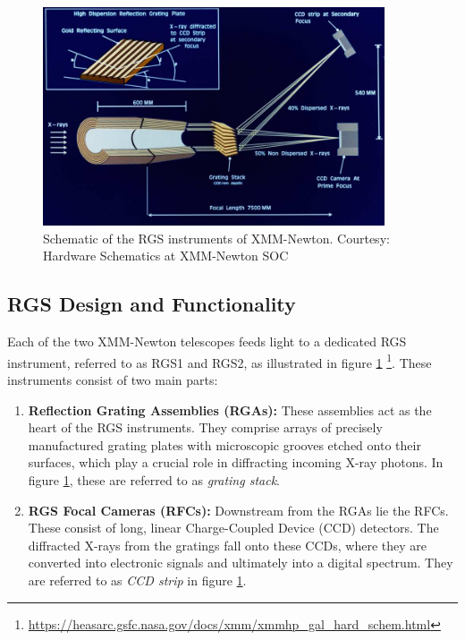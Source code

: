 		\begin{figure}[!htb]
			\centering
			\includegraphics[width=0.9\textwidth]{xmm-rgs.png}
			\caption{Schematic of the RGS instruments of XMM-Newton. Courtesy: Hardware Schematics at XMM-Newton SOC}
			\label{xmm-rgs-instrument}
		\end{figure}
		
		\subsection{RGS Design and Functionality}			
			Each of the two XMM-Newton telescopes feeds light to a dedicated RGS instrument, referred to as RGS1 and RGS2, as illustrated in figure \ref{xmm-rgs-instrument} \footnote{\url{https://heasarc.gsfc.nasa.gov/docs/xmm/xmmhp_gal_hard_schem.html}}. These instruments consist of two main parts:
			\begin{enumerate}
				\item \textbf{Reflection Grating Assemblies (RGAs):} These assemblies act as the heart of the RGS instruments. They comprise arrays of precisely manufactured grating plates with microscopic grooves etched onto their surfaces, which play a crucial role in diffracting incoming X-ray photons. In figure \ref{xmm-rgs-instrument}, these are referred to as \emph{grating stack}.
				
				\item \textbf{RGS Focal Cameras (RFCs):} Downstream from the RGAs lie the RFCs. These consist of long, linear Charge-Coupled Device (CCD) detectors. The diffracted X-rays from the gratings fall onto these CCDs, where they are converted into electronic signals and ultimately into a digital spectrum. They are referred to as \emph{CCD strip} in figure \ref{xmm-rgs-instrument}.
			\end{enumerate}
		
